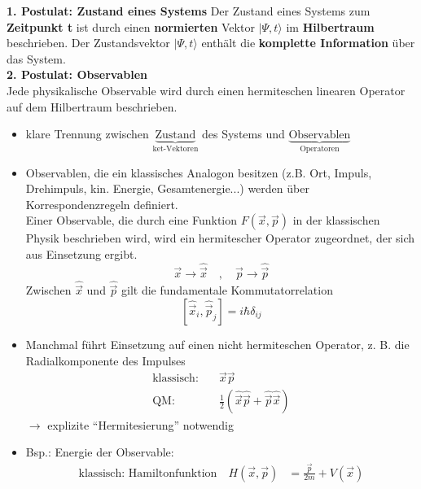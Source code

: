 \documentclass[10pt,article,colorback,accentcolor=tud9d]{scrartcl}
\begin{document}
  \textbf{1. Postulat: Zustand eines Systems}
    Der Zustand eines Systems zum \textbf{Zeitpunkt t} ist durch einen \textbf{normierten} Vektor $\left.\right|\Psi,t\rangle$ im \textbf{Hilbertraum} beschrieben. Der Zustandsvektor $\left.\right|\Psi,t\rangle$ enthält die \textbf{komplette Information} über das System.\\
  \textbf{2. Postulat: Observablen}\\
    Jede physikalische Observable wird durch einen hermiteschen linearen Operator auf dem Hilbertraum beschrieben. 
    \begin{itemize}
      \item klare Trennung zwischen $\underbrace{\text{Zustand}}_{\text{ket-Vektoren}}$ des Systems und $\underbrace{\text{Observablen}}_{\text{Operatoren}}$
      \item Observablen, die ein klassisches Analogon besitzen (z.B. Ort, Impuls, Drehimpuls, kin. Energie, Gesamtenergie...) werden über Korrespondenzregeln definiert. \\
        Einer Observable, die durch eine Funktion $F(\vec{x},\vec{p})$ in der klassischen Physik beschrieben wird, wird ein hermitescher Operator zugeordnet, der sich aus Einsetzung ergibt. 
        $$
        \vec{x} \rightarrow \hat{\vec{x}} \quad, \quad \vec{p} \rightarrow \hat{\vec{p}}
        $$
        Zwischen $\hat{\vec{x}}$ und $\hat{\vec{p}}$ gilt die fundamentale Kommutatorrelation
        \begin{equation}
        \left[\hat{\vec{x}}_i, \hat{\vec{p}}_j\right]=i\hbar\delta_{ij}
        \end{equation}
      \item Manchmal führt Einsetzung auf einen nicht hermiteschen Operator, z. B. die Radialkomponente des Impulses
        \begin{equation}
        \begin{aligned}
          \text{klassisch:} \quad &\vec{x}\vec{p}\\
          \text{QM:} \quad &\frac{1}{2}\left(\hat{\vec{x}}\hat{\vec{p}}+\hat{\vec{p}}\hat{\vec{x}}\right)
        \end{aligned}
        \end{equation}
        $\rightarrow$ explizite "`Hermitesierung"' notwendig
      \item Bsp.: Energie der Observable:
        \begin{equation}
        \begin{aligned}
          \text{klassisch: Hamiltonfunktion} \quad H(\vec{x},\vec{p})&=\frac{\vec{p}}{2m} + V(\vec{x})\\

\end{aligned}
\end{equation}
\end{itemize}
\end{document}

